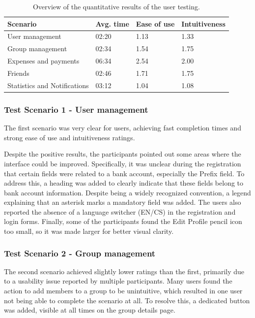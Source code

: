 \documentclass{ctuthesis}
\begin{document}
\begin{table}
\centering
\begin{tabularx}{\textwidth}{|X|l|l|l|}
\hline
\textbf{Scenario} & \textbf{Avg. time} & \textbf{Ease of use} & \textbf{Intuitiveness} \\ \hline

User management              & 02:20 & 1.13 & 1.33 \\ \hline
Group management             & 02:34 & 1.54 & 1.75 \\ \hline
Expenses and payments        & 06:34 & 2.54 & 2.00 \\ \hline
Friends                      & 02:46 & 1.71 & 1.75 \\ \hline
Statistics and Notifications & 03:12 & 1.04 & 1.08 \\ \hline

\end{tabularx}
\caption{Overview of the quantitative results of the user testing.}
\label{table:usertesting}
\end{table}

\subsubsection{Test Scenario 1 - User management}
The first scenario was very clear for users, achieving fast completion times and strong ease of use and intuitiveness ratings.

Despite the positive results, the participants pointed out some areas where the interface could be improved. Specifically, it was unclear during the registration that certain fields were related to a bank account, especially the Prefix field. To address this, a heading was added to clearly indicate that these fields belong to bank account information. Despite being a widely recognized convention, a legend explaining that an asterisk marks a mandatory field was added. The users also reported the absence of a language switcher (EN/CS) in the registration and login forms. Finally, some of the participants found the Edit Profile pencil icon too small, so it was made larger for better visual clarity.

\subsubsection{Test Scenario 2 - Group management}
The second scenario achieved slightly lower ratings than the first, primarily due to a usability issue reported by multiple participants. Many users found the action to add members to a group to be unintuitive, which resulted in one user not being able to complete the scenario at all. To resolve this, a dedicated button was added, visible at all times on the group details page.
\end{document}
